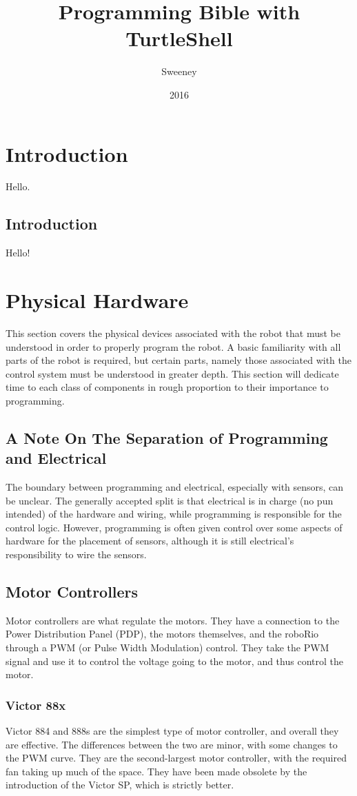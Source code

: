 \documentclass[]{report}
\title{Programming Bible with TurtleShell}
\author{Sweeney}
\date{2016}
\begin{document}
\newcommand{\ITwoC}{I$^{2}$C}
\newcommand{\trademark}{$^{TM}$}
\newcommand{\goodcopyright}{$^{\copyright}$}
\maketitle

\tableofcontents

\chapter{Introduction}
Hello.
\section{Introduction}
Hello!



\chapter{Physical Hardware}
	This section covers the physical devices associated with the robot that must be understood in order to properly program the robot.
	A basic familiarity with all parts of the robot is required, but certain parts, namely those associated with the control system must be understood in greater depth.
	This section will dedicate time to each class of components in rough proportion to their importance to programming.
\section{A Note On The Separation of Programming and Electrical}
	The boundary between programming and electrical, especially with sensors, can be unclear.
	The generally accepted split is that electrical is in charge (no pun intended) of the hardware and wiring, while programming is responsible for the control logic.
	However, programming is often given control over some aspects of hardware for the placement of sensors, although it is still electrical's responsibility to wire the sensors.
\section{Motor Controllers}
	Motor controllers are what regulate the motors.
	They have a connection to the Power Distribution Panel (PDP), the motors themselves, and the roboRio through a PWM (or Pulse Width Modulation) control.
	They take the PWM signal and use it to control the voltage going to the motor, and thus control the motor.
\subsection{Victor 88x}
	Victor 884 and 888s are the simplest type of motor controller, and overall they are effective.
	The differences between the two are minor, with some changes to the PWM curve.
	They are the second-largest motor controller, with the required fan taking up much of the space.
	They have been made obsolete by the introduction of the Victor SP, which is strictly better.
\end{document}
